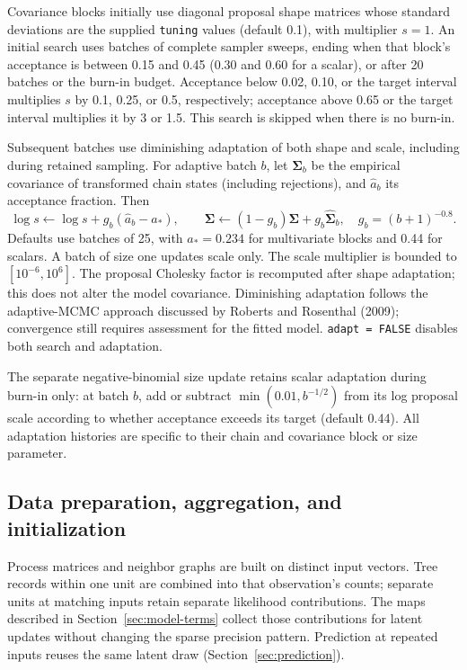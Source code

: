\documentclass[11pt]{article}
\newcommand{\bSigma}{\bm{\Sigma}}
\begin{document}
Covariance blocks initially use diagonal proposal shape matrices whose
standard deviations are the supplied \texttt{tuning} values (default 0.1),
with multiplier \(s=1\). An initial search uses batches of complete sampler
sweeps, ending when that block's acceptance is between 0.15 and 0.45 (0.30 and
0.60 for a scalar), or after 20 batches or the burn-in budget. Acceptance
below 0.02, 0.10, or the target interval multiplies \(s\) by 0.1, 0.25, or
0.5, respectively; acceptance above 0.65 or the target interval multiplies it
by 3 or 1.5. This search is skipped when there is no burn-in.

Subsequent batches use diminishing adaptation of both shape and scale,
including during retained sampling. For adaptive batch \(b\), let
\(\widehat{\bSigma}_b\) be the empirical covariance of transformed chain
states (including rejections), and \(\hat a_b\) its acceptance fraction.
Then
\begin{equation}
 \log s\leftarrow\log s+g_b(\hat a_b-a_*),\qquad
 \bSigma\leftarrow(1-g_b)\bSigma+g_b\widehat{\bSigma}_b,
 \quad g_b=(b+1)^{-0.8}.
 \label{eq:metropolis-adaptation}
\end{equation}
Defaults use batches of 25, with \(a_*=0.234\) for multivariate blocks and
0.44 for scalars. A batch of size one updates scale only. The scale multiplier
is bounded to \([10^{-6},10^6]\). The proposal Cholesky factor is recomputed
after shape adaptation; this does not alter the model covariance.
Diminishing adaptation follows the adaptive-MCMC approach discussed by
Roberts and Rosenthal (2009); convergence still requires assessment for the
fitted model. \texttt{adapt = FALSE} disables both search and adaptation.

The separate negative-binomial size update retains scalar adaptation during
burn-in only: at batch \(b\), add or subtract
\(\min(0.01,b^{-1/2})\) from its log proposal scale according to whether
acceptance exceeds its target (default 0.44). All adaptation histories are
specific to their chain and covariance block or size parameter.

\subsection{Data preparation, aggregation, and initialization}

Process matrices and neighbor graphs are built on distinct input vectors.
Tree records within one unit are combined into that observation's counts;
separate units at matching inputs retain separate likelihood contributions.
The maps described in Section~\ref{sec:model-terms} collect those contributions
for latent updates without changing the sparse precision pattern. Prediction
at repeated inputs reuses the same latent draw
(Section~\ref{sec:prediction}).
\end{document}
